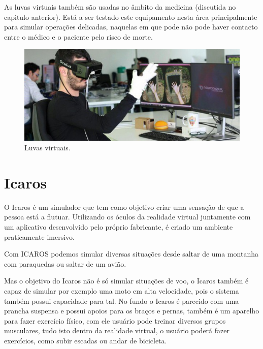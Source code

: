 As luvas virtuais também são usadas no âmbito da medicina (discutida no capitulo anterior). Está a ser testado este equipamento nesta área principalmente para simular operações delicadas, naquelas em que pode não pode haver contacto entre o médico e o paciente pelo risco de morte.


\begin{figure}[h]
\center
\includegraphics[scale=0.6]{imagens/RV_luvas.jpg}
\caption{Luvas virtuais. \cite{RV_luvas}}
\end{figure}


\section{Icaros}

O Icaros é um simulador que tem como objetivo criar uma sensação de que a pessoa está a flutuar. Utilizando os óculos da realidade virtual juntamente com um aplicativo desenvolvido pelo próprio fabricante, é criado um ambiente praticamente imersivo.

Com ICAROS podemos simular diversas situações desde saltar de uma montanha com paraquedas ou saltar de um avião.

Mas o objetivo do Icaros não é só simular situações de voo, o Icaros também é capaz de simular por exemplo uma moto em alta velocidade, pois o sistema também possui capacidade para tal. No fundo o Icaros é parecido com uma prancha suspensa e possui apoios para os braços e pernas, também é um aparelho para fazer exercício físico, com ele usuário pode treinar diversos grupos musculares, tudo isto dentro da realidade virtual, o usuário poderá fazer exercícios, como subir escadas ou andar de bicicleta. 




